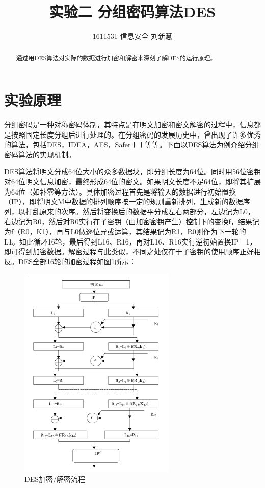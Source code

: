 \documentclass[UTF8,a4paper]{article}
\title{实验二 分组密码算法DES}
\author{1611531-信息安全-刘新慧}
\date{}
\begin{document}
\maketitle

\begin{abstract}
通过用DES算法对实际的数据进行加密和解密来深刻了解DES的运行原理。\par 
\end{abstract}
\tableofcontents
\newpage

	\section{实验原理}
分组密码是一种对称密码体制，其特点是在明文加密和密文解密的过程中，信息都是按照固定长度分组后进行处理的。在分组密码的发展历史中，曾出现了许多优秀的算法，包括DES，IDEA，AES，Safer＋＋等等。下面以DES算法为例介绍分组密码算法的实现机制。\par
DES算法将明文分成64位大小的众多数据块，即分组长度为64位。同时用56位密钥对64位明文信息加密，最终形成64位的密文。如果明文长度不足64位，即将其扩展为64位（如补零等方法）。具体加密过程首先是将输入的数据进行初始置换（IP），即将明文M中数据的排列顺序按一定的规则重新排列，生成新的数据序列，以打乱原来的次序。然后将变换后的数据平分成左右两部分，左边记为L0，右边记为R0，然后对R0实行在子密钥（由加密密钥产生）控制下的变换f，结果记为f（R0，K1），再与L0做逐位异或运算，其结果记为R1，R0则作为下一轮的L1。如此循环16轮，最后得到L16、R16，再对L16、R16实行逆初始置换IP－1，即可得到加密数据。解密过程与此类似，不同之处仅在于子密钥的使用顺序正好相反。DES全部16轮的加密过程如图1所示：\par 
		\begin{figure}[!ht]
	
	\centering
	\includegraphics[width=0.67\textwidth]{1-1.PNG}
	\caption{DES加密/解密流程}
	\label{fig:1-1}
\end{figure}
\end{document}
